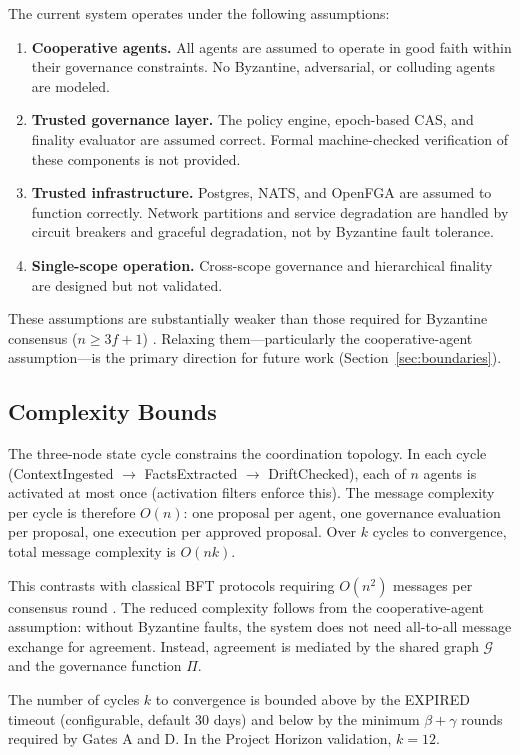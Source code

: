 \documentclass[11pt]{article}
\begin{document}
The current system operates under the following assumptions:

\begin{enumerate}
  \item \textbf{Cooperative agents.} All agents are assumed to operate in good faith within their governance constraints. No Byzantine, adversarial, or colluding agents are modeled.
  \item \textbf{Trusted governance layer.} The policy engine, epoch-based CAS, and finality evaluator are assumed correct. Formal machine-checked verification of these components is not provided.
  \item \textbf{Trusted infrastructure.} Postgres, NATS, and OpenFGA are assumed to function correctly. Network partitions and service degradation are handled by circuit breakers and graceful degradation, not by Byzantine fault tolerance.
  \item \textbf{Single-scope operation.} Cross-scope governance and hierarchical finality are designed but not validated.
\end{enumerate}

These assumptions are substantially weaker than those required for Byzantine consensus ($n \geq 3f+1$) \cite{lamport1982}. Relaxing them---particularly the cooperative-agent assumption---is the primary direction for future work (Section~\ref{sec:boundaries}).

\subsection{Complexity Bounds}

The three-node state cycle constrains the coordination topology. In each cycle (ContextIngested $\to$ FactsExtracted $\to$ DriftChecked), each of $n$ agents is activated at most once (activation filters enforce this). The message complexity per cycle is therefore $O(n)$: one proposal per agent, one governance evaluation per proposal, one execution per approved proposal. Over $k$ cycles to convergence, total message complexity is $O(nk)$.

This contrasts with classical BFT protocols requiring $O(n^2)$ messages per consensus round \cite{castro1999}. The reduced complexity follows from the cooperative-agent assumption: without Byzantine faults, the system does not need all-to-all message exchange for agreement. Instead, agreement is mediated by the shared graph $\mathcal{G}$ and the governance function $\Pi$.

The number of cycles $k$ to convergence is bounded above by the EXPIRED timeout (configurable, default 30 days) and below by the minimum $\beta + \gamma$ rounds required by Gates A and D. In the Project Horizon validation, $k = 12$.
\end{document}
